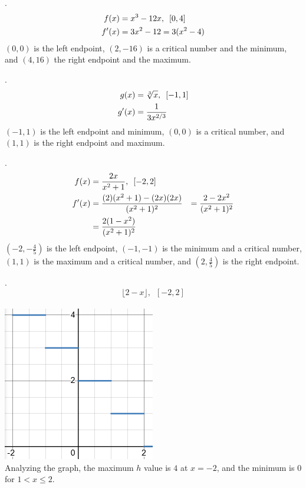 \documentclass[11pt]{article}
\begin{document}
\vspace{1cm}
.\begin{eqnarray}
    \setcounter{equation}{1}
    f(x)&=x^3-12x, \,\,\,[0, 4]\\
    f'(x)&=3x^2-12=3(x^2-4)
\end{eqnarray}
$(0, 0)$ is the left endpoint, $(2, -16)$ is a critical number and the minimum, and $(4, 16)$ the right endpoint and the maximum.

\vspace{1cm}
.\begin{eqnarray}
    \setcounter{equation}{1}
    g(x)&=\sqrt[3]{x}, \,\,\,[-1, 1]\\
    g'(x)&=\frac{1}{3x^{2/3}}
\end{eqnarray}
$(-1, 1)$ is the left endpoint and minimum, $(0, 0)$ is a critical number, and $(1, 1)$ is the right endpoint and maximum.

\vspace{1cm}
.\begin{eqnarray}
    \setcounter{equation}{1}
    f(x)&=\frac{2x}{x^2+1}, \,\,\,[-2, 2]\\
    f'(x)&=\frac{(2)(x^2+1)-(2x)(2x)}{(x^2+1)^2}
    &=\frac{2-2x^2}{(x^2+1)^2}\\
    &=\frac{2(1-x^2)}{(x^2+1)^2}
\end{eqnarray}
$(-2, -\frac{4}{5})$ is the left endpoint, $(-1, -1)$ is the minimum and a critical number, $(1, 1)$ is the maximum and a critical number, and $(2, \frac{4}{5})$ is the right endpoint.

\vspace{1cm}
.\[\lfloor2-x\rfloor,\,\,\, [-2, 2]\]\\
\includegraphics{32.png}\\
Analyzing the graph, the maximum $h$ value is $4$ at $x=-2$, and the minimum is $0$ for $1<x\leq2$.
\end{document}
